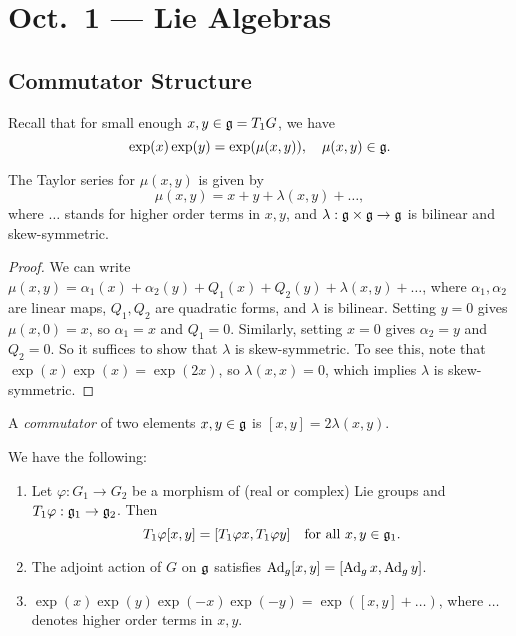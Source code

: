 \chapter{Oct.~1 --- Lie Algebras}

\section{Commutator Structure}

\begin{remark}
  Recall that for small enough
  $x, y \in \mathfrak{g} = T_1 G$, we have
  \[
    \exp(x) \exp(y)
    = \exp(\mu(x, y)), \quad
    \mu(x, y) \in \mathfrak{g}.
  \]
\end{remark}

\begin{lemma}
  The Taylor series for $\mu(x, y)$
  is given by
  \[
    \mu(x, y) = x + y + \lambda(x, y)
    + \dots,
  \]
  where $\dots$ stands for
  higher order terms in $x, y$, and
  $\lambda : \mathfrak{g} \times \mathfrak{g} \to \mathfrak{g}$
  is bilinear and skew-symmetric.
\end{lemma}

\begin{proof}
  We can write
  $\mu(x, y) = \alpha_1(x) + \alpha_2(y) + Q_1(x) + Q_2(y) + \lambda(x, y) + \dots$,
  where $\alpha_1, \alpha_2$ are
  linear maps, $Q_1, Q_2$ are quadratic forms,
  and $\lambda$ is bilinear.
  Setting $y = 0$ gives
  $\mu(x, 0) = x$, so
  $\alpha_1 = x$ and $Q_1 = 0$. Similarly,
  setting $x = 0$ gives $\alpha_2 = y$
  and $Q_2 = 0$. So it suffices to
  show that $\lambda$ is skew-symmetric.
  To see this, note that
  $\exp(x) \exp(x) = \exp(2x)$, so
  $\lambda(x, x) = 0$, which implies
  $\lambda$ is skew-symmetric.
\end{proof}

\begin{definition}
  A \emph{commutator} of
  two elements $x, y \in \mathfrak{g}$ is
  $[x, y] = 2\lambda(x, y)$.
\end{definition}

\begin{prop}
  We have the following:
  \begin{enumerate}
    \item Let $\varphi : G_1 \to G_2$
      be a morphism of (real or complex)
      Lie groups and $T_1 \varphi : \mathfrak{g}_1 \to \mathfrak{g}_2$.
      Then
      \[
        T_1 \varphi[x, y]
        = [T_1 \varphi x, T_1 \varphi y]
        \quad \text{for all $x, y \in \mathfrak{g}_1$}.
      \]
    \item The adjoint action of
      $G$ on $\mathfrak{g}$ satisfies
      $\operatorname{Ad}_g[x, y] = [\operatorname{Ad}_g x, \operatorname{Ad}_g y]$.
    \item $\exp(x) \exp(y) \exp(-x) \exp(-y) = \exp([x, y] + \dots)$,
      where $\dots$ denotes
      higher order terms in $x, y$.
  \end{enumerate}
\end{prop}

